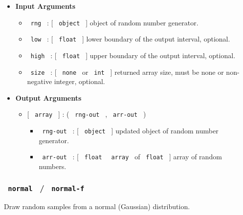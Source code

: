 \begin{itemize}
\item
  \textbf{Input Arguments}

  \begin{itemize}
  \tightlist
  \item
    \texttt{\ rng\ } : {[} \texttt{\ object\ } {]} object of random
    number generator.
  \item
    \texttt{\ low\ } : {[} \texttt{\ float\ } {]} lower boundary of the
    output interval, optional.
  \item
    \texttt{\ high\ } : {[} \texttt{\ float\ } {]} upper boundary of the
    output interval, optional.
  \item
    \texttt{\ size\ } : {[} \texttt{\ none\ } or \texttt{\ int\ } {]}
    returned array size, must be none or non-negative integer, optional.
  \end{itemize}
\item
  \textbf{Output Arguments}

  \begin{itemize}
  \tightlist
  \item
    {[} \texttt{\ array\ } {]} : ( \texttt{\ rng-out\ } ,
    \texttt{\ arr-out\ } )

    \begin{itemize}
    \tightlist
    \item
      \texttt{\ rng-out\ } : {[} \texttt{\ object\ } {]} updated object
      of random number generator.
    \item
      \texttt{\ arr-out\ } : {[} \texttt{\ float\ } \textbar{}
      \texttt{\ array\ } of \texttt{\ float\ } {]} array of random
      numbers.
    \end{itemize}
  \end{itemize}
\end{itemize}

\subsubsection{\texorpdfstring{\texttt{\ normal\ } /
\texttt{\ normal-f\ }}{ normal  /  normal-f }}\label{normal-normal-f}

Draw random samples from a normal (Gaussian) distribution.

\begin{Shaded}
\begin{Highlighting}[]
\end{Highlighting}
\end{Shaded}

